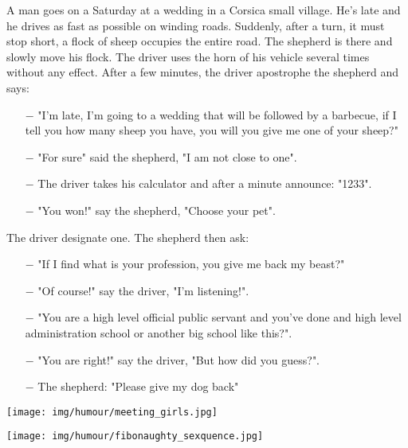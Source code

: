 A man goes on a Saturday at a wedding in a Corsica small village. He's late and he drives as fast as possible on winding roads. Suddenly, after a turn, it must stop short, a flock of sheep occupies the entire road. The shepherd is there and slowly move his flock. The driver uses the horn of his vehicle several times without any effect. After a few minutes, the driver apostrophe the shepherd and says:
\begin{itemize}
	\item[$-$] "I'm late, I'm going to a wedding that will be followed by a barbecue, if I tell you how many sheep you have, you will you give me one of your sheep?"

	\item[$-$] "For sure" said the shepherd, "I am not close to one". 

	\item[$-$] The driver takes his calculator and after a minute announce: "1233".

	\item[$-$] "You won!" say the shepherd, "Choose your pet".
\end{itemize}
The driver designate one. The shepherd then ask:
\begin{itemize}
	\item[$-$] "If I find what is your profession, you give me back my beast?"

	\item[$-$] "Of course!" say the driver, "I'm listening!".

	\item[$-$] "You are a high level official public servant and you've done and high level administration school or another big school like this?".

	\item[$-$] "You are right!" say the driver, "But how did you guess?".

	\item[$-$] The shepherd: "Please give my dog back"
\end{itemize}

\begin{center}\underline{\hspace{5 cm}}\end{center}

	\begin{center}
	\texttt{[image: img/humour/meeting\_girls.jpg]}
	\end{center}

	\begin{center}
	\texttt{[image: img/humour/fibonaughty\_sexquence.jpg]}
	\end{center}
	
